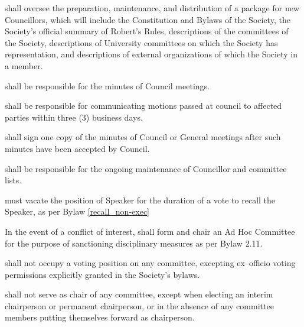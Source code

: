 \begin{longenum}[ label*=\thesubsection.\arabic*., align=left]
    \item shall oversee the preparation, maintenance, and distribution of a package for new Councillors, which will include the Constitution and Bylaws of the Society, the Society's official summary of Robert's Rules, descriptions of the committees of the Society, descriptions of University committees on which the Society has representation, and descriptions of external organizations of which the Society in a member.
    \item shall be responsible for the minutes of Council meetings.
    \item shall be responsible for communicating motions passed at council to affected parties within three (3) business days. 
    \item shall sign one copy of the minutes of Council or General meetings after such minutes have been accepted by Council.
    \item shall be responsible for the ongoing maintenance of Councillor and committee lists.
    \item must vacate the position of Speaker for the duration of a vote to recall the Speaker, as per Bylaw \ref{recall_non-exec}
    \item In the event of a conflict of interest, shall form and chair an Ad Hoc Committee for the purpose of sanctioning disciplinary measures as per Bylaw 2.11.
     \item shall not occupy a voting position on any committee, excepting ex--officio voting permissions explicitly granted in the Society's bylaws.
	\item shall not serve as chair of any committee, except when electing an interim chairperson or permanent chairperson, or in the absence of any committee members putting themselves forward as chairperson.
\end{longenum}

